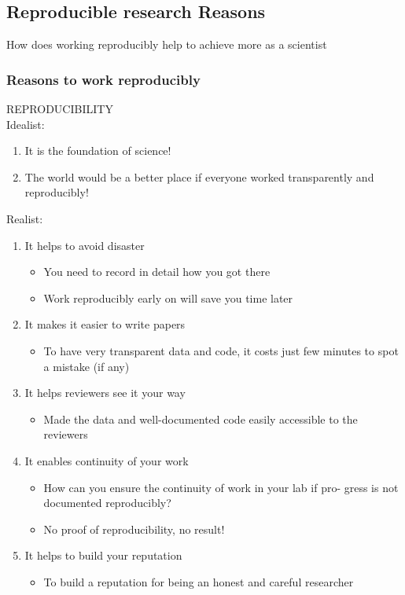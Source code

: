 \documentclass{beamer}
\begin{document}
\begin{frame}
\section{Reproducible research Reasons}
\vspace{50px}
\begin{flushright}
\scriptsize How does working reproducibly help to achieve more as a scientist \citep{Markowetz:2016cs}\\
\end{flushright}
\end{frame}

\begin{frame}
\frametitle{Reasons to work reproducibly}
\Large REPRODUCIBILITY\\
Idealist:
\begin{enumerate}
\tiny
\item It is the foundation of science!
\item The world would be a better place if everyone worked transparently and reproducibly!
\end{enumerate}
Realist:
\begin{enumerate}
\footnotesize
\item It helps to avoid disaster
\begin{itemize}
\tiny
\item You need to record in detail how you got there
\item Work reproducibly early on will save you time later
\end{itemize}
\item It makes it easier to write papers
\begin{itemize}
\tiny
\item To have very transparent data and code, it costs just few minutes to spot a mistake (if any)
\end{itemize}
\item It helps reviewers see it your way
\begin{itemize}
\tiny
\item Made the data and well-documented code easily accessible to the reviewers
\end{itemize}
\item It enables continuity of your work
\begin{itemize}
\tiny
\item How can you ensure the continuity of work in your lab if pro- gress is not documented reproducibly?
\item No proof of reproducibility, no result!
\end{itemize}
\item It helps to build your reputation
\begin{itemize}
\tiny
\item To build a reputation for being an honest and careful researcher
\end{itemize}

\end{enumerate}

\end{frame}
\end{document}
